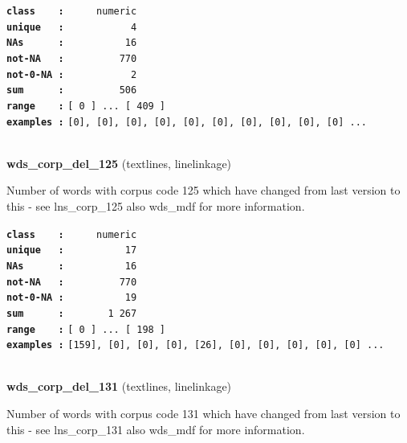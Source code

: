\documentclass[]{article}
\begin{document}
\textbf{\texttt{class\ \ \ \ :}} \texttt{~~~~~numeric}\\
\textbf{\texttt{unique\ \ \ :}} \texttt{~~~~~~~~~~~4}\\
\textbf{\texttt{NAs\ \ \ \ \ \ :}} \texttt{~~~~~~~~~~16}\\
\textbf{\texttt{not-NA\ \ \ :}} \texttt{~~~~~~~~~770}\\
\textbf{\texttt{not-0-NA\ :}} \texttt{~~~~~~~~~~~2}\\
\textbf{\texttt{sum\ \ \ \ \ \ :}} \texttt{~~~~~~~~~506}\\
\textbf{\texttt{range\ \ \ \ :}}
\texttt{{[}\ 0\ {]}\ ...\ {[}\ 409\ {]}}\\
\textbf{\texttt{examples\ :}}
\texttt{{[}0{]},\ {[}0{]},\ {[}0{]},\ {[}0{]},\ {[}0{]},\ {[}0{]},\ {[}0{]},\ {[}0{]},\ {[}0{]},\ {[}0{]}\ ...}\\

~

\textbf{wds\_corp\_del\_125} (textlines, linelinkage)

Number of words with corpus code 125 which have changed from last
version to this - see lns\_corp\_125 also wds\_mdf for more information.

\textbf{\texttt{class\ \ \ \ :}} \texttt{~~~~~numeric}\\
\textbf{\texttt{unique\ \ \ :}} \texttt{~~~~~~~~~~17}\\
\textbf{\texttt{NAs\ \ \ \ \ \ :}} \texttt{~~~~~~~~~~16}\\
\textbf{\texttt{not-NA\ \ \ :}} \texttt{~~~~~~~~~770}\\
\textbf{\texttt{not-0-NA\ :}} \texttt{~~~~~~~~~~19}\\
\textbf{\texttt{sum\ \ \ \ \ \ :}} \texttt{~~~~~~~1~267}\\
\textbf{\texttt{range\ \ \ \ :}}
\texttt{{[}\ 0\ {]}\ ...\ {[}\ 198\ {]}}\\
\textbf{\texttt{examples\ :}}
\texttt{{[}159{]},\ {[}0{]},\ {[}0{]},\ {[}0{]},\ {[}26{]},\ {[}0{]},\ {[}0{]},\ {[}0{]},\ {[}0{]},\ {[}0{]}\ ...}\\

~

\textbf{wds\_corp\_del\_131} (textlines, linelinkage)

Number of words with corpus code 131 which have changed from last
version to this - see lns\_corp\_131 also wds\_mdf for more information.
\end{document}
